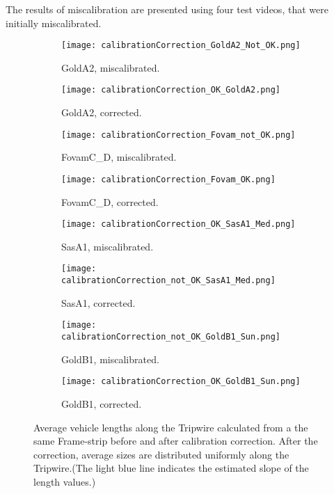 The results of miscalibration are presented using four test videos, that were initially miscalibrated.


\addtolength{\topmargin}{-.6in}
\begin{figure}[p]
	\thispagestyle{empty}
	\centering
	\begin{subfigure}[t]{0.36\textwidth}
		\texttt{[image: calibrationCorrection\_GoldA2\_Not\_OK.png]}
		\caption{GoldA2, miscalibrated.}
	\end{subfigure}
	\quad
	\begin{subfigure}[t]{0.36\textwidth}
		\texttt{[image: calibrationCorrection\_OK\_GoldA2.png]}
		\caption{GoldA2, corrected.}
	\end{subfigure}
	\hfill
	\begin{subfigure}[t]{0.36\textwidth}
		\texttt{[image: calibrationCorrection\_Fovam\_not\_OK.png]}
		\caption{FovamC\_D, miscalibrated.}
	\end{subfigure}
	\quad
	\begin{subfigure}[t]{0.36\textwidth}
		\texttt{[image: calibrationCorrection\_Fovam\_OK.png]}
		\caption{FovamC\_D, corrected.}
	\end{subfigure}
\hfill
\begin{subfigure}[t]{0.36\textwidth}
	\texttt{[image: calibrationCorrection\_OK\_SasA1\_Med.png]}
	\caption{SasA1, miscalibrated.}
\end{subfigure}
\quad
\begin{subfigure}[t]{0.36\textwidth}
	\texttt{[image: calibrationCorrection\_not\_OK\_SasA1\_Med.png]}
	\caption{SasA1, corrected.}
\end{subfigure}
\hfill
\begin{subfigure}[t]{0.36\textwidth}
	\texttt{[image: calibrationCorrection\_not\_OK\_GoldB1\_Sun.png]}
	\caption{GoldB1, miscalibrated.}
\end{subfigure}
\quad
\begin{subfigure}[t]{0.36\textwidth}
	\texttt{[image: calibrationCorrection\_OK\_GoldB1\_Sun.png]}
	\caption{GoldB1, corrected.}
\end{subfigure}
	\caption{Average vehicle lengths along the Tripwire calculated from a the same Frame-strip before and after calibration correction. After the correction, average sizes are distributed uniformly along the Tripwire.(The light blue line indicates the estimated slope of the length values.)\label{fig:calibrations2}}
\end{figure}

